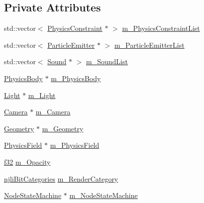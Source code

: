 \subsection*{Private Attributes}
\begin{DoxyCompactItemize}
\item 
std\+::vector$<$ \mbox{\hyperlink{classnjli_1_1_physics_constraint}{Physics\+Constraint}} $\ast$ $>$ \mbox{\hyperlink{classnjli_1_1_node_a90d39973dc81175e6adca0d979c96e8b}{m\+\_\+\+Physics\+Constraint\+List}}
\item 
std\+::vector$<$ \mbox{\hyperlink{classnjli_1_1_particle_emitter}{Particle\+Emitter}} $\ast$ $>$ \mbox{\hyperlink{classnjli_1_1_node_a11d81ddc7960f5357631c4ab873eac09}{m\+\_\+\+Particle\+Emitter\+List}}
\item 
std\+::vector$<$ \mbox{\hyperlink{classnjli_1_1_sound}{Sound}} $\ast$ $>$ \mbox{\hyperlink{classnjli_1_1_node_a968bedfe579efae3b70fd75400ba8d94}{m\+\_\+\+Sound\+List}}
\item 
\mbox{\hyperlink{classnjli_1_1_physics_body}{Physics\+Body}} $\ast$ \mbox{\hyperlink{classnjli_1_1_node_acb3dd8658ad0f052d0afff42c5257367}{m\+\_\+\+Physics\+Body}}
\item 
\mbox{\hyperlink{classnjli_1_1_light}{Light}} $\ast$ \mbox{\hyperlink{classnjli_1_1_node_a3bd3dfc6fc7857a16b591198fc9de860}{m\+\_\+\+Light}}
\item 
\mbox{\hyperlink{classnjli_1_1_camera}{Camera}} $\ast$ \mbox{\hyperlink{classnjli_1_1_node_a943cf43bef4f74a93f967842f9e8a348}{m\+\_\+\+Camera}}
\item 
\mbox{\hyperlink{classnjli_1_1_geometry}{Geometry}} $\ast$ \mbox{\hyperlink{classnjli_1_1_node_a6f79b7a2b199147e83dfc3460c4b7481}{m\+\_\+\+Geometry}}
\item 
\mbox{\hyperlink{classnjli_1_1_physics_field}{Physics\+Field}} $\ast$ \mbox{\hyperlink{classnjli_1_1_node_af9deeb8e605b08425cf8076a51b4936a}{m\+\_\+\+Physics\+Field}}
\item 
\mbox{\hyperlink{_util_8h_a5f6906312a689f27d70e9d086649d3fd}{f32}} \mbox{\hyperlink{classnjli_1_1_node_a367e50aad4d7657d62f0ec39115a70e3}{m\+\_\+\+Opacity}}
\item 
\mbox{\hyperlink{namespacenjli_af7b302a2b48bb644f85c88080925c974}{njli\+Bit\+Categories}} \mbox{\hyperlink{classnjli_1_1_node_ab01d7fb7fdf191957e526d32ddf7a6e8}{m\+\_\+\+Render\+Category}}
\item 
\mbox{\hyperlink{classnjli_1_1_node_state_machine}{Node\+State\+Machine}} $\ast$ \mbox{\hyperlink{classnjli_1_1_node_ab74c5f3135cff558ae020a1bcc0339fa}{m\+\_\+\+Node\+State\+Machine}}

\end{DoxyCompactItemize}

